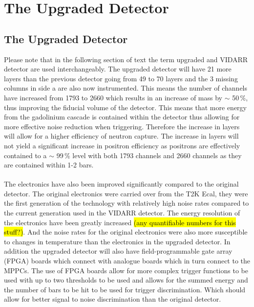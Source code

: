 \chapter{The Upgraded Detector} \label{Chp:TheUpgradedDetector}

\ifpdf
    \graphicspath{{Chapter3/Figs/Raster/}{Chapter3/Figs/PDF/}{Chapter3/Figs/}}
\else
    \graphicspath{{Chapter3/Figs/Vector/}{Chapter3/Figs/}}
\fi

\section{The Upgraded Detector}\label{sec:theUpgradedDetector}
Please note that in the following section of text the term upgraded and VIDARR detector are used interchangeably. The upgraded detector will have 21 more layers than the previous detector going from 49 to 70 layers and the 3 missing columns in side a are also now instrumented. This means the number of channels have increased from 1793 to 2660 which results in an increase of mass by $\sim$ 50\,\%, thus improving the fiducial volume of the detector. This means that more energy from the gadolinium cascade is contained within the detector thus allowing for more effective noise reduction when triggering. Therefore the increase in layers will allow for a higher efficiency of neutron capture. The increase in layers will not yield a significant increase in positron efficiency as positrons are effectively contained to a $\sim$ 99\,\% level with both 1793 channels and 2660 channels as they are contained within 1-2 bars.
\\\\The electronics have also been improved significantly compared to the original detector. The original electronics were carried over from the T2K Ecal, they were the first generation of the technology with relatively high noise rates compared to the current generation used in the VIDARR detector. The energy resolution of the electronics have been greatly increased \hl{(any quantifiable numbers for this stuff?)}. And the noise rates for the original electronics were also more susceptible to changes in temperature than the electronics in the upgraded detector. In addition the upgraded detector will also have field-programmable gate array (FPGA) boards which connect with analogue boards which in turn connect to the MPPCs. The use of FPGA boards allow for more complex trigger functions to be used with up to two thresholds to be used and allows for the summed energy and the number of bars to be hit to be used for trigger discrimination. Which should allow for better signal to noise discrimination than the original detector.
